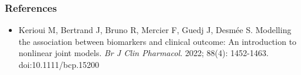 \documentclass[11pt,
compress,
]{beamer}
\begin{document}
\begin{frame}
	\frametitle{References}
	\vspace{-1cm}
\begin{itemize}
\item Kerioui M, Bertrand J, Bruno R, Mercier F, Guedj J, Desmée S. Modelling the association between biomarkers and clinical outcome: An introduction to nonlinear joint models. \textit{Br J Clin Pharmacol}. 2022; 88(4): 1452-1463. doi:10.1111/bcp.15200
\end{itemize}
\end{frame}






		
		
		
\end{document}
